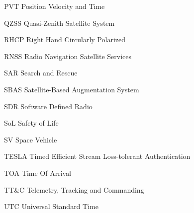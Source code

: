 \begin{abbreviations}
\item[PVT] Position Velocity and Time
\item[QZSS] Quasi-Zenith Satellite System
\item[RHCP] Right Hand Circularly Polarized
\item[RNSS] Radio Navigation Satellite Services
\item[SAR] Search and Rescue
\item[SBAS] Satellite-Based Augmentation System
\item[SDR] Software Defined Radio
\item[SoL] Safety of Life
\item[SV] Space Vehicle
\item[TESLA] Timed Efficient Stream Loss-tolerant Authentication
\item[TOA] Time Of Arrival
\item[TT&C] Telemetry, Tracking and Commanding
\item[UTC] Universal Standard Time

\end{abbreviations}
